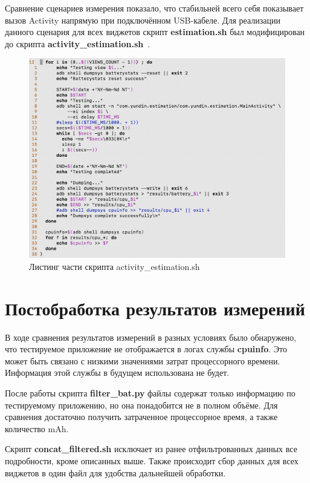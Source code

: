 \documentclass[a4paper,14pt]{extarticle} %
\begin{document}
	Сравнение сценариев измерения показало, что стабильней всего себя показывает вызов Activity напрямую при подключённом USB-кабеле. Для реализации данного сценария для всех виджетов скрипт \textbf{estimation.sh} был модифицирован до скрипта \textbf{activity\_estimation.sh}~\ris{\ref{fig:activity_estimation}}.
	
	\begin{figure}[tbh]
		\includegraphics[width=\textwidth]{activity_estimation}
		\caption{Листинг части скрипта activity\_estimation.sh}
		\label{fig:activity_estimation}
	\end{figure}

	\clearpage
	\section{Постобработка результатов измерений}
	
	В ходе сравнения результатов измерений в разных условиях было обнаружено, что тестируемое приложение не отображается в логах службы \textbf{cpuinfo}. Это может быть связано с низкими значениями затрат процессорного времени. Информация этой службы в будущем использована не будет.
	
	После работы скрипта \textbf{filter\_bat.py} файлы содержат только информацию по тестируемому приложению, но она понадобится не в полном объёме. Для сравнения достаточно получить затраченное процессорное время, а также количество mAh.
	
	Скрипт \textbf{concat\_filtered.sh} исключает из ранее отфильтрованных данных все подробности, кроме описанных выше. Также происходит сбор данных для всех виджетов в один файл для удобства дальнейшей обработки.
	
\end{document}
